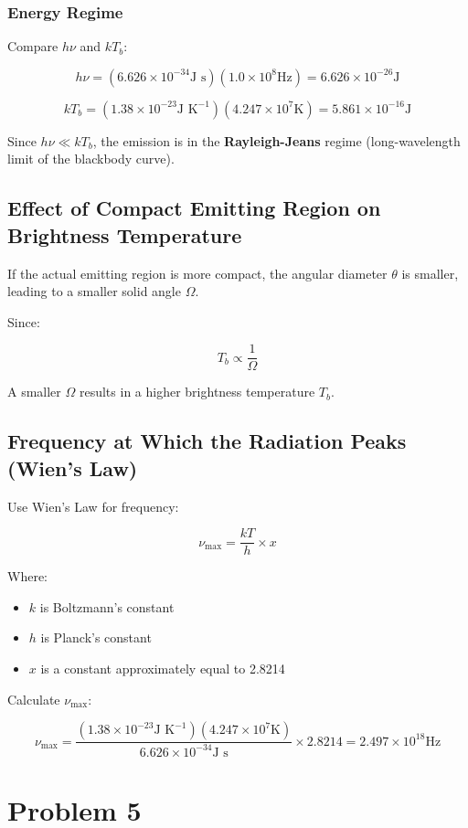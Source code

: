 \documentclass[12pt]{article}
\begin{document}
\subsubsection{Energy Regime}

Compare $h \nu$ and $k T_b$:

\[
    h \nu = (6.626 \times 10^{-34}\text{J s})(1.0 \times 10^{8}\text{Hz}) = 6.626 \times 10^{-26}\text{J}
\]

\[
    k T_b = (1.38 \times 10^{-23}\text{J K}^{-1})(4.247 \times 10^{7}\text{K}) = 5.861 \times 10^{-16}\text{J}
\]

Since $h \nu \ll k T_b$, the emission is in the \textbf{Rayleigh-Jeans} regime (long-wavelength limit of the blackbody curve).

\bigskip

\subsection{Effect of Compact Emitting Region on Brightness Temperature}

If the actual emitting region is more compact, the angular diameter $\theta$ is smaller, leading to a smaller solid angle $\Omega$.

Since:

\[
    T_b \propto \dfrac{1}{\Omega}
\]

A smaller $\Omega$ results in a higher brightness temperature $T_b$.

\bigskip

\subsection{Frequency at Which the Radiation Peaks (Wien's Law)}

Use Wien's Law for frequency:

\[
    \nu_{\text{max}} = \dfrac{k T}{h} \times x
\]

Where:
\begin{itemize}
    \item $k$ is Boltzmann's constant
    \item $h$ is Planck's constant
    \item $x$ is a constant approximately equal to 2.8214
\end{itemize}

Calculate $\nu_{\text{max}}$:

\[
    \nu_{\text{max}} = \dfrac{(1.38 \times 10^{-23}\text{J K}^{-1})(4.247 \times 10^{7}\text{K})}{6.626 \times 10^{-34}\text{J s}} \times 2.8214 = 2.497 \times 10^{18}\text{Hz}
\]

\newpage

\section{Problem 5}

\newpage



\nocite{El-Deeb_PEU-438_Assignments}
\end{document}
